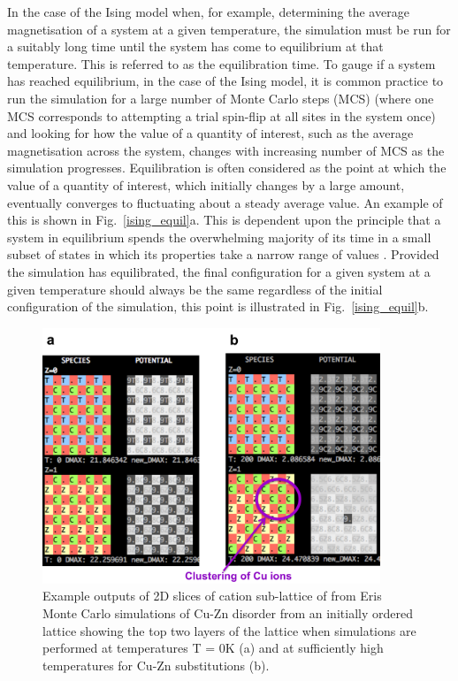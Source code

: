 \documentclass[11pt, twoside]{report}
\begin{document}
In the case of the Ising model when, for example, determining the average magnetisation of a system at a given temperature, the simulation must be run for a suitably long time until the system has come to equilibrium at that temperature. This is referred to as the equilibration time. 
To gauge if a system has reached equilibrium, in the case of the Ising model, it is common practice to run the simulation for a large number of Monte Carlo steps (MCS) (where one MCS corresponds to attempting a trial spin-flip at all sites in the system once) and looking for how the value of a quantity of interest, such as the average magnetisation across the system, changes with increasing number of MCS as the simulation progresses. Equilibration is often considered as the point at which the value of a quantity of interest, which initially changes by a large amount, eventually converges to fluctuating about a steady average value. An example of this is shown in Fig.~\ref{ising_equil}a. This is dependent upon the principle that a system in equilibrium spends the overwhelming majority of its time in a small subset of states in which its properties take a narrow range of values \cite{MC}. Provided the simulation has equilibrated, the final configuration for a given system at a given temperature should always be the same regardless of the initial configuration of the simulation, this point is illustrated in Fig.~\ref{ising_equil}b.

\begin{figure}[h!]
  \centering
    \includegraphics[width=0.9\textwidth]{figures/eris_spatial_disorder.png}
    \caption{Example outputs of 2D slices of cation sub-lattice of {\CZTS} from Eris Monte Carlo simulations of Cu-Zn disorder from an initially ordered lattice showing the top two layers of the lattice when simulations are performed at temperatures T = 0K (a) and at sufficiently high temperatures for Cu-Zn substitutions (b).}
  \label{eris_spatial_disorder}
\end{figure}
\end{document}
